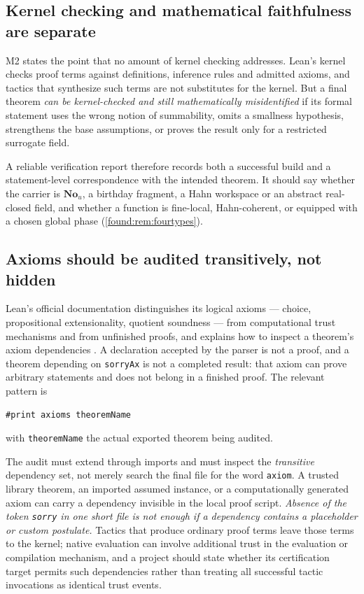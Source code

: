 \documentclass[11pt,letterpaper]{article}
\numberwithin{equation}{section}
\theoremstyle{definition}
\theoremstyle{remark}
\newcommand{\No}{\mathbf{No}}
\begin{document}
\subsection{Kernel checking and mathematical faithfulness are separate}
\label{found:sub:faithfulness}
M2 states the point that no amount of kernel checking addresses. Lean's kernel
checks proof terms against definitions, inference rules and admitted axioms, and
tactics that synthesize such terms are not substitutes for the kernel. But a
final theorem \emph{can be kernel-checked and still mathematically
misidentified} if its formal statement uses the wrong notion of summability,
omits a smallness hypothesis, strengthens the base assumptions, or proves the
result only for a restricted surrogate field.

A reliable verification report therefore records both a successful build and a
statement-level correspondence with the intended theorem. It should say whether
the carrier is $\No_u$, a birthday fragment, a Hahn workspace or an abstract
real-closed field, and whether a function is fine-local, Hahn-coherent, or
equipped with a chosen global phase (\cref{found:rem:fourtypes}).

\subsection{Axioms should be audited transitively, not hidden}
\label{found:sub:axiomaudit}
Lean's official documentation distinguishes its logical axioms --- choice,
propositional extensionality, quotient soundness --- from computational trust
mechanisms and from unfinished proofs, and explains how to inspect a theorem's
axiom dependencies \cite{found:LeanAxioms,found:LeanValidation}. A declaration
accepted by the parser is not a proof, and a theorem depending on
\texttt{sorryAx} is not a completed result: that axiom can prove arbitrary
statements and does not belong in a finished proof. The relevant pattern is
\begin{samepage}
\begin{lstlisting}
#print axioms theoremName
\end{lstlisting}
\end{samepage}
with \texttt{theoremName} the actual exported theorem being audited.

The audit must extend through imports and must inspect the \emph{transitive}
dependency set, not merely search the final file for the word \texttt{axiom}. A
trusted library theorem, an imported assumed instance, or a computationally
generated axiom can carry a dependency invisible in the local proof script.
\emph{Absence of the token \texttt{sorry} in one short file is not enough if a
dependency contains a placeholder or custom postulate.} Tactics that produce
ordinary proof terms leave those terms to the kernel; native evaluation can
involve additional trust in the evaluation or compilation mechanism, and a
project should state whether its certification target permits such dependencies
rather than treating all successful tactic invocations as identical trust
events.
\end{document}
